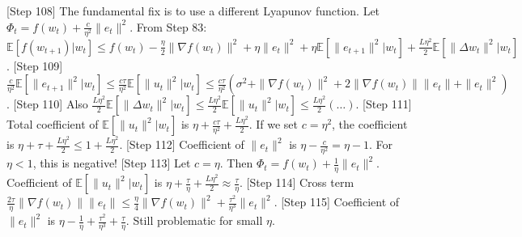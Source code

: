 \documentclass{article}
\newcommand{\E}{\mathbb{E}}
\begin{document}
[Step 108] The fundamental fix is to use a different Lyapunov function. Let $\Phi_t = f(w_t) + \frac{c}{\eta^2} \|e_t\|^2$.
From Step 83: $\E[f(w_{t+1})|w_t] \leq f(w_t) - \frac{\eta}{2}\|\nabla f(w_t)\|^2 + \eta\|e_t\|^2 + \eta\E[\|e_{t+1}\|^2|w_t] + \frac{L\eta^2}{2}\E[\|\Delta w_t\|^2|w_t]$.
[Step 109] $\frac{c}{\eta^2} \E[\|e_{t+1}\|^2|w_t] \leq \frac{c\tau}{\eta^2} \E[\|u_t\|^2|w_t] \leq \frac{c\tau}{\eta^2} \left( \sigma^2 + \|\nabla f(w_t)\|^2 + 2\|\nabla f(w_t)\|\|e_t\| + \|e_t\|^2 \right)$.
[Step 110] Also $\frac{L\eta^2}{2} \E[\|\Delta w_t\|^2|w_t] \leq \frac{L\eta^2}{2} \E[\|u_t\|^2|w_t] \leq \frac{L\eta^2}{2} (\dots)$.
[Step 111] Total coefficient of $\E[\|u_t\|^2|w_t]$ is $\eta + \frac{c\tau}{\eta^2} + \frac{L\eta^2}{2}$. If we set $c = \eta^2$, the coefficient is $\eta + \tau + \frac{L\eta^2}{2} \leq 1 + \frac{L\eta^2}{2}$.
[Step 112] Coefficient of $\|e_t\|^2$ is $\eta - \frac{c}{\eta^2} = \eta - 1$. For $\eta < 1$, this is negative!
[Step 113] Let $c = \eta$. Then $\Phi_t = f(w_t) + \frac{1}{\eta} \|e_t\|^2$.
Coefficient of $\E[\|u_t\|^2|w_t]$ is $\eta + \frac{\tau}{\eta} + \frac{L\eta^2}{2} \approx \frac{\tau}{\eta}$.
[Step 114] Cross term $\frac{2\tau}{\eta} \|\nabla f(w_t)\|\|e_t\| \leq \frac{\eta}{4} \|\nabla f(w_t)\|^2 + \frac{\tau^2}{\eta^3} \|e_t\|^2$.
[Step 115] Coefficient of $\|e_t\|^2$ is $\eta - \frac{1}{\eta} + \frac{\tau^2}{\eta^3} + \frac{\tau}{\eta}$. Still problematic for small $\eta$.
\end{document}

